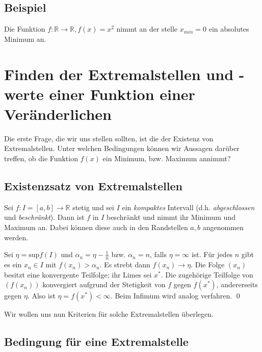 \subsection*{Beispiel}

Die Funktion $f: \mathbb{R} \rightarrow \mathbb{R}, f(x) = x^2$ nimmt an der stelle $x_{min} = 0$ ein absolutes Minimum an.

\section{Finden der Extremalstellen und -werte einer Funktion einer Veränderlichen}

Die erste Frage, die wir uns stellen sollten, ist die der Existenz von Extremalstellen. Unter welchen Bedingungen können wir 
Aussagen darüber treffen, ob die Funktion $f(x)$ ein Minimum, bzw. Maximum annimmt?

\subsection{Existenzsatz von Extremalstellen}
\begin{thm}
    Sei $f: I = [a,b] \rightarrow \mathbb{R}$ stetig und sei $I$ ein \textit{kompaktes} Intervall (d.h. {\it abgeschlossen} und
    {\it beschränkt}). Dann ist $f$ in $I$ beschränkt und nimmt ihr Minimum und Maximum an. Dabei können diese auch in den
    Randstellen $a, b$ angenommen werden.
\end{thm}
\begin{beweis}
    Sei $\eta = \mathrm{sup}f(I)$ und $\alpha_n = \eta - \frac{1}{n}$ bzw. $\alpha_n = n$, falls $\eta = \infty$ ist. Für jedes
    $n$ gibt es ein $x_n\in I$ mit $f(x_n) > \alpha_n$. Es strebt dann $f(x_n)\rightarrow\eta$. Die Folge $(x_n)$ besitzt eine
    konvergente Teilfolge; ihr Limes sei $x^\ast$. Die zugehörige Teilfolge von $(f(x_n))$ konvergiert aufgrund der Stetigkeit
    von $f$ gegen $f(x^\ast)$, andererseits gegen $\eta$. Also ist $\eta = f(x^\ast) < \infty$. Beim Infimum wird analog verfahren.
    \qed
\end{beweis}

Wir wollen uns nun Kriterien für solche Extremalstellen überlegen.

\subsection{Bedingung für eine Extremalstelle}

